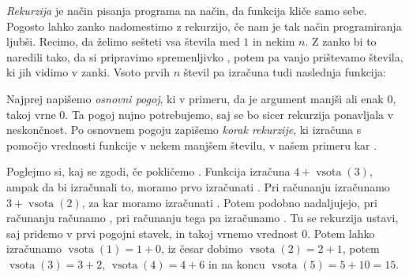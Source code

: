 

\emph{Rekurzija} je način pisanja programa na način, da funkcija kliče samo
sebe.
Pogosto lahko zanko nadomestimo z rekurzijo, če nam je tak način programiranja
ljubši.
Recimo, da želimo sešteti vsa števila med $1$ in nekim $n$.
Z zanko bi to naredili tako, da si pripravimo spremenljivko , potem
pa vanjo prištevamo števila, ki jih vidimo v zanki.
Vsoto prvih $n$ števil pa izračuna tudi naslednja funkcija:


Najprej napišemo \emph{osnovni pogoj}, ki v primeru, da je argument 
manjši ali enak $0$, takoj vrne $0$.
Ta pogoj nujno potrebujemo, saj se bo sicer rekurzija ponavljala v neskončnost.
Po osnovnem pogoju zapišemo \emph{korak rekurzije}, ki izračuna 
s pomočjo vrednosti funkcije v nekem manjšem številu, v našem primeru kar
.

Poglejmo si, kaj se zgodi, če pokličemo .
Funkcija izračuna $4 + \operatorname{vsota}(3)$, ampak da bi izračunali to,
moramo prvo izračunati .
Pri računanju  izračunamo $3 + \operatorname{vsota}(2)$, za kar
moramo izračunati .
Potem podobno nadaljujejo, pri računanju  računamo
, pri računanju tega pa izračunamo .
Tu se rekurzija ustavi, saj pridemo v prvi pogojni stavek, in takoj vrnemo
vrednost $0$.
Potem lahko izračunamo $\operatorname{vsota}(1) = 1 + 0$, iz česar dobimo
$\operatorname{vsota}(2) = 2 + 1$, potem $\operatorname{vsota}(3) = 3 + 2$,
$\operatorname{vsota}(4) = 4 + 6$ in na koncu $\operatorname{vsota}(5) = 5 + 10
= 15$.